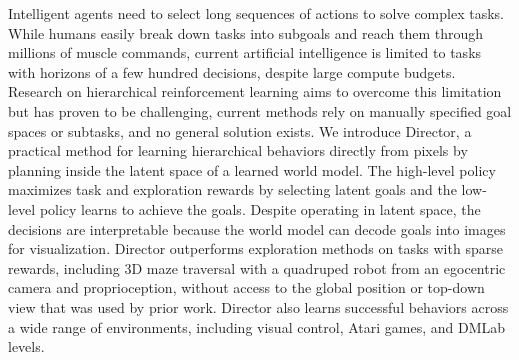 Intelligent agents need to select long sequences of actions to solve complex tasks. While humans easily break down tasks into subgoals and reach them through millions of muscle commands, current artificial intelligence is limited to tasks with horizons of a few hundred decisions, despite large compute budgets. Research on hierarchical reinforcement learning aims to overcome this limitation but has proven to be challenging, current methods rely on manually specified goal spaces or subtasks, and no general solution exists. We introduce Director, a practical method for learning hierarchical behaviors directly from pixels by planning inside the latent space of a learned world model. The high-level policy maximizes task and exploration rewards by selecting latent goals and the low-level policy learns to achieve the goals. Despite operating in latent space, the decisions are interpretable because the world model can decode goals into images for visualization. Director outperforms exploration methods on tasks with sparse rewards, including 3D maze traversal with a quadruped robot from an egocentric camera and proprioception, without access to the global position or top-down view that was used by prior work. Director also learns successful behaviors across a wide range of environments, including visual control, Atari games, and DMLab levels.

